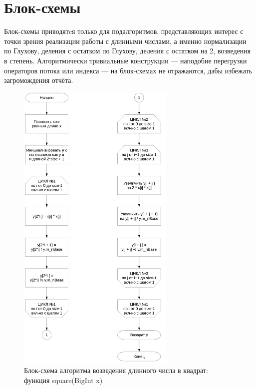 \documentclass[a4paper,12pt]{article} %
\begin{document}






\section*{Блок-схемы}

Блок-схемы приводятcя только для подалгоритмов, представляющих интерес с точки зрения реализации работы с длинными числами,
а именно нормализации по Глухову, деления с остатком по Глухову,
деления с остатком на 2, возведения в степень.
Алгоритмически тривиальные конструкции --- наподобие перегрузки операторов потока или индекса --- на блок-схемах не отражаются,
дабы избежать загромождения отчёта.

\begin{figure}[ht]
	\centering
	\includegraphics[width=0.67\textwidth]{lr2_square.pdf}
	\caption{Блок-схема алгоритма возведения длинного числа в квадрат: функция square(BigInt x)}
\end{figure}
\end{document}
